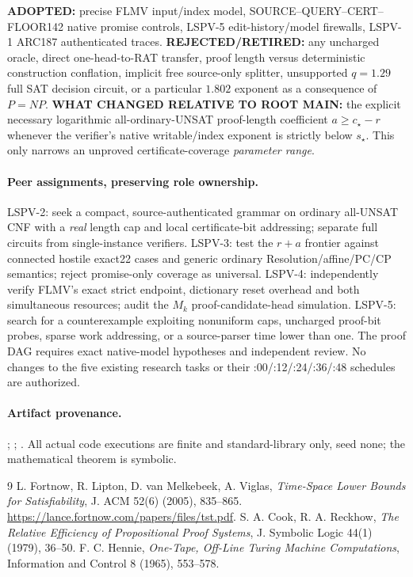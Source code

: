\documentclass[11pt]{article}
\begin{document}
\noindent\textbf{ADOPTED:} precise FLMV input/index model,
SOURCE--QUERY--CERT--FLOOR142 native promise controls,
LSPV-5 edit-history/model firewalls,
LSPV-1 ARC187 authenticated traces.
\textbf{REJECTED/RETIRED:} any uncharged oracle,
direct one-head-to-RAT transfer, proof length versus
deterministic construction conflation, implicit free
source-only splitter, unsupported $q=1.29$ full SAT
decision circuit, or a particular $1.802$ exponent
as a consequence of $P=NP$.
\textbf{WHAT CHANGED RELATIVE TO ROOT MAIN:}
the explicit necessary logarithmic all-ordinary-UNSAT
proof-length coefficient $a\ge c_\star-r$ whenever
the verifier's native writable/index exponent is
strictly below $s_\star$. This only narrows an
unproved certificate-coverage \emph{parameter range}.

\paragraph{Peer assignments, preserving role ownership.}
LSPV-2: seek a compact, source-authenticated grammar on
ordinary all-UNSAT CNF with a \emph{real} length cap and
local certificate-bit addressing; separate full circuits
from single-instance verifiers.
LSPV-3: test the $r+a$ frontier against connected
hostile exact22 cases and generic ordinary
Resolution/affine/PC/CP semantics; reject promise-only
coverage as universal.
LSPV-4: independently verify FLMV's exact strict endpoint,
dictionary reset overhead and both simultaneous resources;
audit the $M_k$ proof-candidate-head simulation.
LSPV-5: search for a counterexample exploiting nonuniform
caps, uncharged proof-bit probes, sparse work addressing,
or a source-parser time lower than one. The proof DAG
requires exact native-model hypotheses and independent review.
No changes to the five existing research tasks or their
:00/:12/:24/:36/:48 schedules are authorized.

\paragraph{Artifact provenance.}
;
;
.
All actual code executions are finite and standard-library only,
seed none; the mathematical theorem is symbolic.

\begin{thebibliography}{9}
L. Fortnow, R. Lipton, D. van Melkebeek, A. Viglas,
\emph{Time-Space Lower Bounds for Satisfiability},
J. ACM 52(6) (2005), 835--865.
\url{https://lance.fortnow.com/papers/files/tst.pdf}.
S. A. Cook, R. A. Reckhow,
\emph{The Relative Efficiency of Propositional Proof Systems},
J. Symbolic Logic 44(1) (1979), 36--50.
F. C. Hennie,
\emph{One-Tape, Off-Line Turing Machine Computations},
Information and Control 8 (1965), 553--578.
\end{thebibliography}
\end{document}
